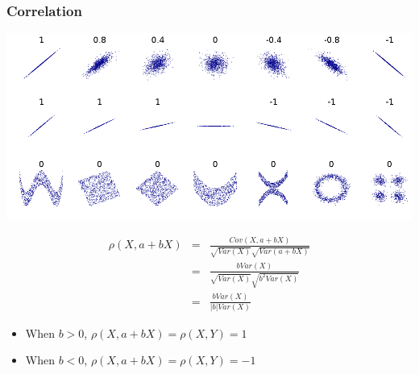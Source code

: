 \documentclass[slidestop,compress,mathserif]{beamer}
\begin{document}
\begin{frame}
\frametitle{Correlation}

\vfill

\begin{center}
\includegraphics[width=\textwidth]{figures/corr.png}
\end{center}

\vfill

\end{frame}


\begin{frame}
\pause
\begin{eqnarray*}
\rho(X, a + bX) &=& \frac{Cov(X, a + bX)}{\sqrt{Var(X)}\sqrt{Var(a + bX)}} \\
&=&
\frac{bVar(X)}{\sqrt{Var(X)}\sqrt{b^2Var(X)}} \\
&=& \frac{bVar(X)}{|b|Var(X)}
\end{eqnarray*}
\pause
\begin{itemize}
\item When $b > 0$, $\rho(X, a + bX) = \rho(X, Y) = 1$
\item When $b < 0$, $\rho(X, a + bX) = \rho(X, Y) = -1$
\end{itemize}
\end{frame}


\end{document}
